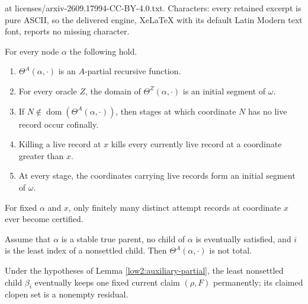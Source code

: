\documentclass[10pt,a4paper]{amsart}
\begin{document}
at licenses/arxiv-2609.17994-CC-BY-4.0.txt. Characters: every retained excerpt is pure ASCII, so the delivered engine, XeLaTeX with its default Latin Modern text font, reports no missing character.
\begin{lemma}\label{low2:ordered-search-facts}
For every node $\alpha$ the following hold.
\begin{enumerate}[label=(\roman*)]
\item $\Theta^A(\alpha,\cdot)$ is an $A$-partial recursive function.
\item For every oracle $Z$, the domain of $\Theta^Z(\alpha,\cdot)$ is an
      initial segment of $\omega$.
\item If $N\notin\operatorname{dom}(\Theta^A(\alpha,\cdot))$, then stages at
      which coordinate $N$ has no live record occur cofinally.
\item Killing a live record at $x$ kills every currently live record at a
      coordinate greater than $x$.
\item At every stage, the coordinates carrying live records form an initial
      segment of $\omega$.
\end{enumerate}
\end{lemma}

\begin{lemma}\label{low2:finite-certification}
For fixed $\alpha$ and $x$, only finitely many distinct attempt records at
coordinate $x$ ever become certified.
\end{lemma}

\begin{lemma}\label{low2:auxiliary-partial}
Assume that $\alpha$ is a stable true parent, no child of $\alpha$ is
eventually satisfied, and $i$ is the least index of a nonsettled child. Then
$\Theta^A(\alpha,\cdot)$ is not total.
\end{lemma}

\begin{lemma}\label{low2:permanent-residual}
Under the hypotheses of Lemma \ref{low2:auxiliary-partial}, the least
nonsettled child $\beta_i$ eventually keeps one fixed current claim
$(\rho,F)$ permanently; its claimed clopen set is a nonempty residual.
\end{lemma}
\end{document}
